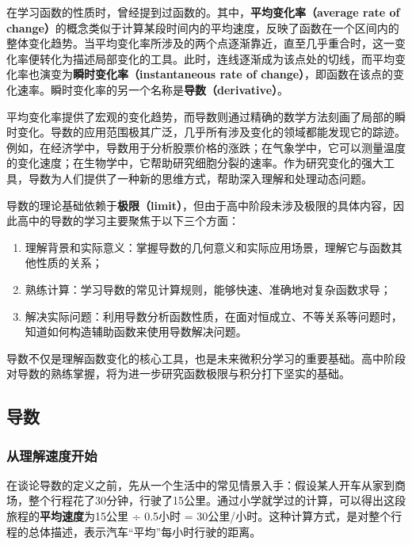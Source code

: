 
\begin{issues}
\issueDraft
\end{issues}

在学习函数的性质时，曾经提到过函数的。其中，\textbf{平均变化率（average rate of change）}的概念类似于计算某段时间内的平均速度，反映了函数在一个区间内的整体变化趋势。当平均变化率所涉及的两个点逐渐靠近，直至几乎重合时，这一变化率便转化为描述局部变化的工具。此时，连线逐渐成为该点处的切线，而平均变化率也演变为\textbf{瞬时变化率（instantaneous rate of change）}，即函数在该点的变化速率。瞬时变化率的另一个名称是\textbf{导数（derivative）}。

平均变化率提供了宏观的变化趋势，而导数则通过精确的数学方法刻画了局部的瞬时变化。导数的应用范围极其广泛，几乎所有涉及变化的领域都能发现它的踪迹。例如，在经济学中，导数用于分析股票价格的涨跌；在气象学中，它可以测量温度的变化速度；在生物学中，它帮助研究细胞分裂的速率。作为研究变化的强大工具，导数为人们提供了一种新的思维方式，帮助深入理解和处理动态问题。

导数的理论基础依赖于\textbf{极限（limit）}，但由于高中阶段未涉及极限的具体内容，因此高中的导数的学习主要聚焦于以下三个方面：
\begin{enumerate}
\item 理解背景和实际意义：掌握导数的几何意义和实际应用场景，理解它与函数其他性质的关系；
\item 熟练计算：学习导数的常见计算规则，能够快速、准确地对复杂函数求导；
\item 解决实际问题：利用导数分析函数性质，在面对恒成立、不等关系等问题时，知道如何构造辅助函数来使用导数解决问题。
\end{enumerate}

导数不仅是理解函数变化的核心工具，也是未来微积分学习的重要基础。高中阶段对导数的熟练掌握，将为进一步研究函数极限与积分打下坚实的基础。

\subsection{导数}

\subsubsection{从理解速度开始}

在谈论导数的定义之前，先从一个生活中的常见情景入手：假设某人开车从家到商场，整个行程花了30分钟，行驶了15公里。通过小学就学过的计算，可以得出这段旅程的\textbf{平均速度}为15公里 ÷ 0.5小时 = 30公里/小时。这种计算方式，是对整个行程的总体描述，表示汽车“平均”每小时行驶的距离。

